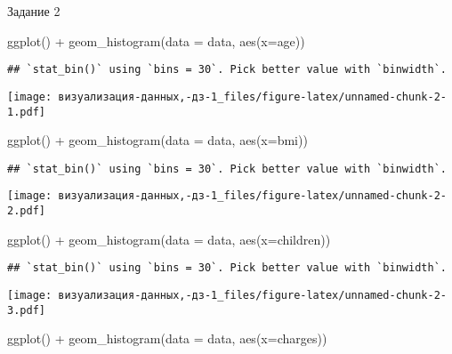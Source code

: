 \documentclass[
]{article}
\newenvironment{Shaded}{\begin{snugshade}}{\end{snugshade}}
\newcommand{\AttributeTok}[1]{\textcolor[rgb]{0.77,0.63,0.00}{#1}}
\newcommand{\FunctionTok}[1]{\textcolor[rgb]{0.00,0.00,0.00}{#1}}
\newcommand{\NormalTok}[1]{#1}
\newcommand{\SpecialCharTok}[1]{\textcolor[rgb]{0.00,0.00,0.00}{#1}}
\begin{document}
Задание 2

\begin{Shaded}
\begin{Highlighting}[]
\FunctionTok{ggplot}\NormalTok{() }\SpecialCharTok{+}
  \FunctionTok{geom\_histogram}\NormalTok{(}\AttributeTok{data =}\NormalTok{ data, }\FunctionTok{aes}\NormalTok{(}\AttributeTok{x=}\NormalTok{age))}
\end{Highlighting}
\end{Shaded}

\begin{verbatim}
## `stat_bin()` using `bins = 30`. Pick better value with `binwidth`.
\end{verbatim}

\texttt{[image: визуализация-данных,-дз-1\_files/figure-latex/unnamed-chunk-2-1.pdf]}

\begin{Shaded}
\begin{Highlighting}[]
\FunctionTok{ggplot}\NormalTok{() }\SpecialCharTok{+}
  \FunctionTok{geom\_histogram}\NormalTok{(}\AttributeTok{data =}\NormalTok{ data, }\FunctionTok{aes}\NormalTok{(}\AttributeTok{x=}\NormalTok{bmi))}
\end{Highlighting}
\end{Shaded}

\begin{verbatim}
## `stat_bin()` using `bins = 30`. Pick better value with `binwidth`.
\end{verbatim}

\texttt{[image: визуализация-данных,-дз-1\_files/figure-latex/unnamed-chunk-2-2.pdf]}

\begin{Shaded}
\begin{Highlighting}[]
\FunctionTok{ggplot}\NormalTok{() }\SpecialCharTok{+}
  \FunctionTok{geom\_histogram}\NormalTok{(}\AttributeTok{data =}\NormalTok{ data, }\FunctionTok{aes}\NormalTok{(}\AttributeTok{x=}\NormalTok{children))}
\end{Highlighting}
\end{Shaded}

\begin{verbatim}
## `stat_bin()` using `bins = 30`. Pick better value with `binwidth`.
\end{verbatim}

\texttt{[image: визуализация-данных,-дз-1\_files/figure-latex/unnamed-chunk-2-3.pdf]}

\begin{Shaded}
\begin{Highlighting}[]
\FunctionTok{ggplot}\NormalTok{() }\SpecialCharTok{+}
  \FunctionTok{geom\_histogram}\NormalTok{(}\AttributeTok{data =}\NormalTok{ data, }\FunctionTok{aes}\NormalTok{(}\AttributeTok{x=}\NormalTok{charges))}
\end{Highlighting}
\end{Shaded}
\end{document}
